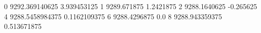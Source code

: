 0 9292.369140625 3.939453125
1 9289.671875 1.2421875
2 9288.1640625 -0.265625
4 9288.5458984375 0.1162109375
6 9288.4296875 0.0
8 9288.943359375 0.513671875
